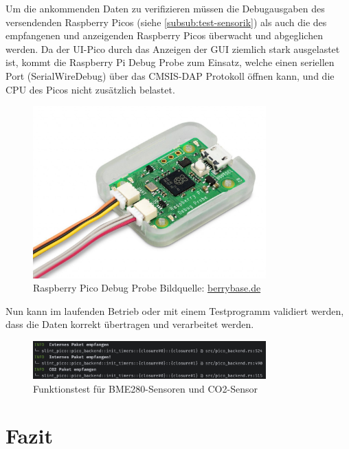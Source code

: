 \documentclass[a4paper,11pt]{article}
\begin{document}
\vspace{0.2cm}
\noindent
Um die ankommenden Daten zu verifizieren müssen die Debugausgaben des versendenden Raspberry Picos (siehe \ref{subsub:test-sensorik}) als auch die des empfangenen und anzeigenden Raspberry Picos überwacht und abgeglichen werden.
Da der UI-Pico durch das Anzeigen der GUI ziemlich stark ausgelastet ist, kommt die Raspberry Pi Debug Probe zum Einsatz, welche einen seriellen Port (SerialWireDebug) über das CMSIS-DAP Protokoll öffnen kann, und die CPU des Picos nicht zusätzlich belastet.

\begin{figure}[H]
	\centering
	\includegraphics[width=0.8\textwidth]{DebugProbe.jpg}
	\caption{Raspberry Pico Debug Probe Bildquelle: \href{https://www.berrybase.de/media/image/c2/87/07/ID_207742_orig_1280x1280.jpg}{berrybase.de}}
	\label{fig:debugprobe}
\end{figure}

\noindent
Nun kann im laufenden Betrieb oder mit einem Testprogramm validiert werden, dass die Daten korrekt übertragen und verarbeitet werden.

\begin{figure}[H]
	\centering
	\includegraphics[width=0.8\textwidth]{FunktionstestGUI-INT-EXT-CO2.png}
	\caption{Funktionstest für BME280-Sensoren und CO2-Sensor}
	\label{fig:funktionstest-dcf-meteo}
\end{figure}


\section{Fazit}
\label{sub:fazit}
\end{document}
